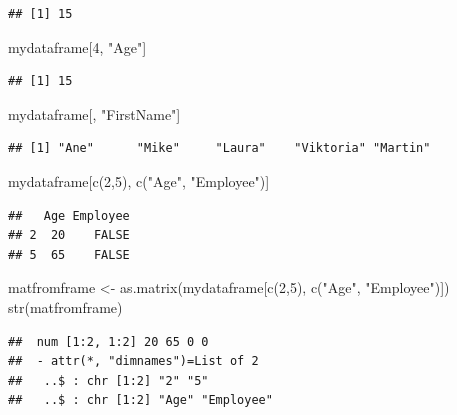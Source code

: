 \documentclass[
]{book}
\newenvironment{Shaded}{\begin{snugshade}}{\end{snugshade}}
\newcommand{\DecValTok}[1]{\textcolor[rgb]{0.00,0.00,0.81}{#1}}
\newcommand{\FunctionTok}[1]{\textcolor[rgb]{0.00,0.00,0.00}{#1}}
\newcommand{\NormalTok}[1]{#1}
\newcommand{\OtherTok}[1]{\textcolor[rgb]{0.56,0.35,0.01}{#1}}
\newcommand{\StringTok}[1]{\textcolor[rgb]{0.31,0.60,0.02}{#1}}
\begin{document}
\begin{verbatim}
## [1] 15
\end{verbatim}

\begin{Shaded}
\begin{Highlighting}[]
\NormalTok{mydataframe[}\DecValTok{4}\NormalTok{, }\StringTok{"Age"}\NormalTok{]}
\end{Highlighting}
\end{Shaded}

\begin{verbatim}
## [1] 15
\end{verbatim}

\begin{Shaded}
\begin{Highlighting}[]
\NormalTok{mydataframe[, }\StringTok{"FirstName"}\NormalTok{]}
\end{Highlighting}
\end{Shaded}

\begin{verbatim}
## [1] "Ane"      "Mike"     "Laura"    "Viktoria" "Martin"
\end{verbatim}

\begin{Shaded}
\begin{Highlighting}[]
\NormalTok{mydataframe[}\FunctionTok{c}\NormalTok{(}\DecValTok{2}\NormalTok{,}\DecValTok{5}\NormalTok{), }\FunctionTok{c}\NormalTok{(}\StringTok{"Age"}\NormalTok{, }\StringTok{"Employee"}\NormalTok{)]}
\end{Highlighting}
\end{Shaded}

\begin{verbatim}
##   Age Employee
## 2  20    FALSE
## 5  65    FALSE
\end{verbatim}

\begin{Shaded}
\begin{Highlighting}[]
\NormalTok{matfromframe }\OtherTok{\textless{}{-}} \FunctionTok{as.matrix}\NormalTok{(mydataframe[}\FunctionTok{c}\NormalTok{(}\DecValTok{2}\NormalTok{,}\DecValTok{5}\NormalTok{), }\FunctionTok{c}\NormalTok{(}\StringTok{"Age"}\NormalTok{, }\StringTok{"Employee"}\NormalTok{)])}
\FunctionTok{str}\NormalTok{(matfromframe)}
\end{Highlighting}
\end{Shaded}

\begin{verbatim}
##  num [1:2, 1:2] 20 65 0 0
##  - attr(*, "dimnames")=List of 2
##   ..$ : chr [1:2] "2" "5"
##   ..$ : chr [1:2] "Age" "Employee"
\end{verbatim}
\end{document}
